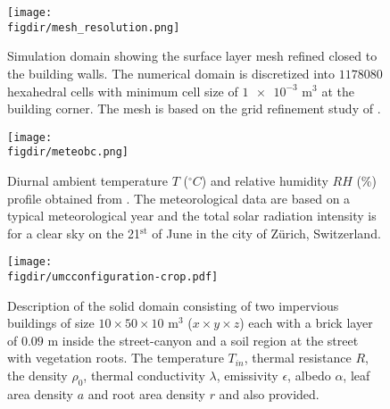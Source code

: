 \begin{figure}[p]
	\centering
	\texttt{[image: \\figdir/mesh\_resolution.png]}
	\caption{Simulation domain showing the surface layer mesh refined closed to the building walls. The numerical domain is discretized into $\num{1178080}$ hexahedral cells with minimum cell size of $\num{1e-3}$ m$^{3}$ at the building corner. The mesh is based on the grid refinement study of \cite{Kubilay2018}.}
	\label{fig:mesh_resolution}
\end{figure}

\begin{figure}[p]
	\centering
	\texttt{[image: \\figdir/meteobc.png]}
	\caption{Diurnal ambient temperature $T$ ($^{\circ}C$) and relative humidity $RH$ (\%) profile obtained from \cite{Kubilay2018}. The meteorological data are based on a typical meteorological year and the total solar radiation intensity is for a clear sky on the 21$^{\mathrm{st}}$ of June in the city of Z\"urich, Switzerland. }
	\label{fig:meteobc}
\end{figure}

\begin{figure}[p]
	\centering
	\texttt{[image: \\figdir/umcconfiguration-crop.pdf]}%
	\caption{Description of the solid domain consisting of two impervious buildings of size $10 \times 50 \times 10$ m$^3$ ($x\times y \times z$) each with a brick layer of $0.09$ m inside the street-canyon and a soil region at the street with vegetation roots. The temperature $T_{\textit{in}}$, thermal resistance $R$, the density $\rho_0$, thermal conductivity $\lambda$, emissivity $\epsilon$, albedo $\alpha$, leaf area density $a$ and root area density $r$ and also provided. }
	\label{fig:soliddomain}
\end{figure}


